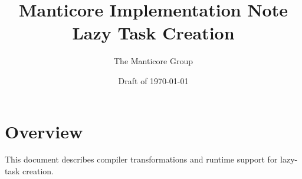 \documentclass[11pt]{article}
\title{Manticore Implementation Note \\ Lazy Task Creation}
\author{The Manticore Group}
\date{Draft of \today}
\begin{document}
\maketitle

\section{Overview}
This document describes compiler transformations and runtime support for lazy-task creation.
\end{document}
